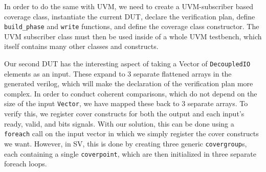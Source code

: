 \documentclass[conference]{IEEEtran}
\newcommand{\martin}[1]{{\color{blue} Martin: #1}}
\begin{document}
In order to do the same with UVM, we need to 
create a UVM-subscriber based coverage class, 
instantiate the current DUT, %
declare the verification plan, 
define \texttt{build\_phase} and \texttt{write} functions, 
and define the coverage class constructor.
The UVM subscriber class must then be used inside of a whole UVM testbench, which itself contains many other classes and constructs.

Our second DUT has the interesting aspect of taking a Vector of \texttt{DecoupledIO} elements as an input. 
These expand to 3 separate flattened arrays in the generated verilog, which will make the declaration of the verification plan more complex. %
In order to conduct coherent comparisons, which do not depend on the size of the input \texttt{Vector}, we have mapped these back to 3 separate arrays.
To verify this, we register cover constructs for both the output and each input's ready, valid, and bits signals.
With our solution, this can be done using a \texttt{foreach} call on the input vector in which we simply register the cover constructs we want.
However, in SV, this is done by creating three generic \texttt{covergroup}s, each containing a single \texttt{coverpoint}, which are then initialized in three separate foreach loops.
 
\end{document}
